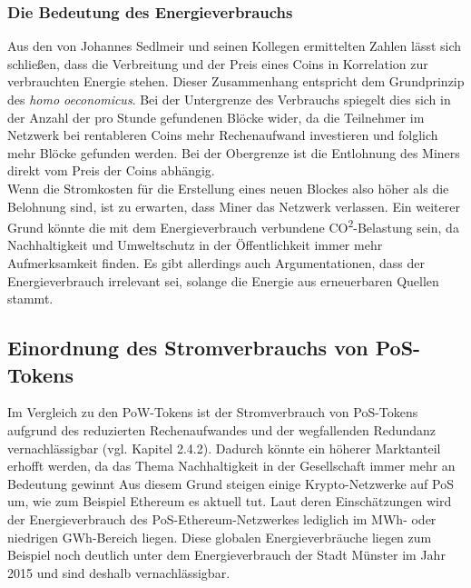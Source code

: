 \documentclass[12pt]{article}
\begin{document}
\subsubsection{Die Bedeutung des Energieverbrauchs}
Aus den von Johannes Sedlmeir und seinen Kollegen ermittelten Zahlen lässt sich schließen, dass die Verbreitung und der Preis eines Coins in Korrelation zur verbrauchten Energie stehen. Dieser Zusammenhang entspricht dem Grundprinzip des \textit{homo oeconomicus}. Bei der Untergrenze des Verbrauchs spiegelt dies sich in der Anzahl der pro Stunde gefundenen Blöcke wider, da die Teilnehmer im Netzwerk bei rentableren Coins mehr Rechenaufwand investieren und folglich mehr Blöcke gefunden werden. Bei der Obergrenze ist die Entlohnung des Miners direkt vom Preis der Coins abhängig.\\
Wenn die Stromkosten für die Erstellung eines neuen Blockes also höher als die Belohnung sind, ist zu erwarten, dass Miner das Netzwerk verlassen. Ein weiterer Grund könnte die mit dem Energieverbrauch verbundene CO\textsuperscript{2}-Belastung sein, da Nachhaltigkeit und Umweltschutz in der Öffentlichkeit immer mehr Aufmerksamkeit finden. Es gibt allerdings auch Argumentationen, dass der Energieverbrauch irrelevant sei, solange die Energie aus erneuerbaren Quellen stammt.

\subsection{Einordnung des Stromverbrauchs von PoS-Tokens}
Im Vergleich zu den PoW-Tokens ist der Stromverbrauch von PoS-Tokens aufgrund des reduzierten Rechenaufwandes und der wegfallenden Redundanz vernachlässigbar (vgl. Kapitel 2.4.2). Dadurch könnte ein höherer Marktanteil erhofft werden, da das Thema Nachhaltigkeit in der Gesellschaft immer mehr an Bedeutung gewinnt Aus diesem Grund steigen einige Krypto-Netzwerke auf PoS um, wie zum Beispiel Ethereum es aktuell tut. Laut deren Einschätzungen wird der Energieverbrauch des PoS-Ethereum-Netzwerkes lediglich im MWh- oder niedrigen GWh-Bereich liegen. Diese globalen Energieverbräuche liegen zum Beispiel noch deutlich unter dem Energieverbrauch der Stadt Münster im Jahr 2015 und sind deshalb vernachlässigbar.
\end{document}
